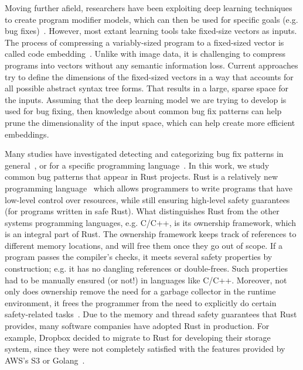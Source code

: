 Moving further afield, researchers have been exploiting deep learning techniques to create program modifier models, which can then be used for specific goals (e.g. bug fixes)~\cite{alon2019code2vec,alon2018general,raychev2016learning,bielik2016phog}. However, most extant learning tools take fixed-size vectors as inputs. The process of compressing a variably-sized program to a fixed-sized vector is called code embedding~\cite{chen2019literature}. Unlike with image data, it is challenging to compress programs into vectors without any semantic information loss. Current approaches try to define the dimensions of the fixed-sized vectors in a way that accounts for all possible abstract syntax tree forms. That results in a large, sparse space for the inputs. Assuming that the deep learning model we are trying to develop is used for bug fixing, then knowledge about common bug fix patterns can help prune the dimensionality of the input space, which can help create more efficient embeddings.

Many studies have investigated detecting and categorizing bug fix patterns in general~\cite{islam2021changes,madeiral2018towards,pan2009toward}, or for a specific programming language~\cite{yang2022mining,hanam2016discovering,campos2019discovering}. In this work, we study common bug patterns that appear in Rust projects. Rust is a relatively new programming language~\cite{klabnik2019rust} which allows programmers to write programs that have low-level control over resources, while still ensuring high-level safety guarantees (for programs written in safe Rust). What distinguishes Rust from the other systems programming languages, e.g. C/C++, is its ownership framework, which is an integral part of Rust. The ownership framework keeps track of references to different memory locations, and will free them once they go out of scope. If a program passes the compiler’s checks, it meets several safety properties by construction; e.g. it has no dangling references or double-frees. Such properties had to be manually ensured (or not!) in languages like C/C++. Moreover, not only does ownership remove the need for a garbage collector in the runtime environment, it frees the programmer from the need to explicitly do certain safety-related tasks~\cite{qin2020understanding}. Due to the memory and thread safety guarantees that Rust provides, many software companies have adopted Rust in production. For example, Dropbox decided to migrate to Rust for developing their storage system, since they were not completely satisfied with the features provided by AWS’s S3 or Golang~\cite{dropbox}.

